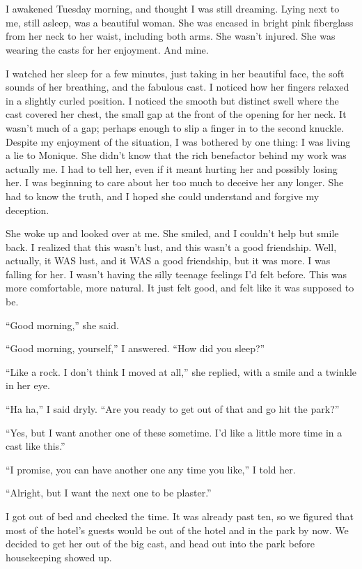 \chapter{}
I awakened Tuesday morning, and thought I was still dreaming. Lying next to me, still
asleep, was a beautiful woman. She was encased in bright pink fiberglass from her neck to her
waist, including both arms. She wasn't injured. She was wearing the casts for her enjoyment. And
mine.

I watched her sleep for a few minutes, just taking in her beautiful face, the soft sounds
of her breathing, and the fabulous cast. I noticed how her fingers relaxed in a slightly curled
position. I noticed the smooth but distinct swell where the cast covered her chest, the small
gap at the front of the opening for her neck. It wasn't much of a gap; perhaps enough to slip a
finger in to the second knuckle. Despite my enjoyment of the situation, I was bothered by one
thing: I was living a lie to Monique. She didn't know that the rich benefactor behind my work
was actually me. I had to tell her, even if it meant hurting her and possibly losing her. I was
beginning to care about her too much to deceive her any longer. She had to know the truth, and I
hoped she could understand and forgive my deception.

She woke up and looked over at me. She smiled, and I couldn't help but smile back. I
realized that this wasn't lust, and this wasn't a good friendship. Well, actually, it WAS lust,
and it WAS a good friendship, but it was more. I was falling for her. I wasn't having the silly
teenage feelings I'd felt before. This was more comfortable, more natural. It just felt good,
and felt like it was supposed to be.

``Good morning,'' she said.

``Good morning, yourself,'' I answered. ``How did you sleep?''

``Like a rock. I don't think I moved at all,'' she replied, with a smile and a twinkle in her
eye.

``Ha ha,'' I said dryly. ``Are you ready to get out of that and go hit the park?''

``Yes, but I want another one of these sometime. I'd like a little more time in a cast like
this.''

``I promise, you can have another one any time you like,'' I told her.

``Alright, but I want the next one to be plaster.''

I got out of bed and checked the time. It was already past ten, so we figured that most of
the hotel's guests would be out of the hotel and in the park by now. We decided to get her out
of the big cast, and head out into the park before housekeeping showed up.

